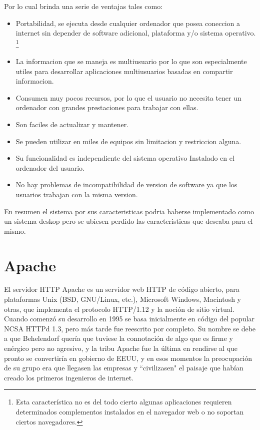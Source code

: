 Por lo cual brinda una serie de ventajas tales como:

\begin{itemize}
    \item Portabilidad, se ejecuta desde cualquier ordenador que posea coneccion a internet sin depender de software adicional, plataforma y/o sistema operativo. \footnote{Esta característica no es del todo cierto algunas aplicaciones requieren determinados complementos instalados en el navegador web o no soportan ciertos navegadores.}
    \item La informacion que se maneja es multiusuario por lo que son especialmente utiles para         desarrollar aplicaciones multiusuarios basadas en compartir informacion.
    \item Consumen muy pocos recursos, por lo que el usuario no necesita tener un ordenador con         grandes prestaciones para trabajar con ellas.
    \item Son faciles de actualizar y mantener.
    \item Se pueden utilizar en miles de equipos sin limitacion y restriccion alguna.
    \item Su funcionalidad es independiente del sistema operativo Instalado en el ordenador del  usuario.
    \item No hay problemas de incompatibilidad de version de software ya que los usuarios trabajan con la misma version.
\end{itemize}

En resumen el sistema por sus caracteristicas podria haberse implementado como un sistema deskop pero se ubiesen perdido las caracteristicas que deseaba para el mismo. 


\section{Apache}

El servidor HTTP Apache es un servidor web HTTP de código abierto, para plataformas Unix (BSD, GNU/Linux, etc.), Microsoft Windows, Macintosh y otras, que implementa el protocolo HTTP/1.12 y la noción de sitio virtual. Cuando comenzó su desarrollo en 1995 se basa inicialmente en código del popular NCSA HTTPd 1.3, pero más tarde fue reescrito por completo. Su nombre se debe a que Behelendorf quería que tuviese la connotación de algo que es firme y enérgico pero no agresivo, y la tribu Apache fue la última en rendirse al que pronto se convertiría en gobierno de EEUU, y en esos momentos la preocupación de su grupo era que llegasen las empresas y ``civilizasen" el paisaje que habían creado los primeros ingenieros de internet.\\[0.1cm]

